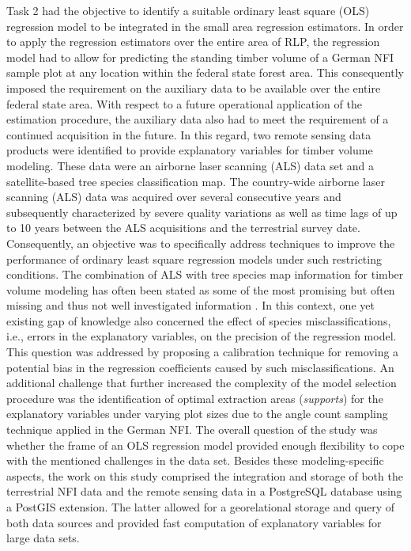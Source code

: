 Task 2 had the objective to identify a suitable ordinary least square (OLS) regression model to be integrated in the small area regression estimators. In order to apply the regression estimators over the entire area of RLP, the regression model had to allow for predicting the standing timber volume of a German NFI sample plot at any location within the federal state forest area. This consequently imposed the requirement on the auxiliary data to be available over the entire federal state area. With respect to a future operational application of the estimation procedure, the auxiliary data also had to meet the requirement of a continued acquisition in the future. In this regard, two remote sensing data products were identified to provide explanatory variables for timber volume modeling. These data were an airborne laser scanning (ALS) data set and a satellite-based tree species classification map. The country-wide airborne laser scanning (ALS) data was acquired over several consecutive years and subsequently characterized by severe quality variations as well as time lags of up to 10 years between the ALS acquisitions and the terrestrial survey date. Consequently, an objective was to specifically address techniques to improve the performance of ordinary least square regression models under such restricting conditions. The combination of ALS with tree species map information for timber volume modeling has often been stated as some of the most promising but often missing and thus not well investigated information \citep{koch2010, white2016}. In this context, one yet existing gap of knowledge also concerned the effect of species misclassifications, i.e., errors in the explanatory variables, on the precision of the regression model. This question was addressed by proposing a calibration technique for removing a potential bias in the regression coefficients caused by such misclassifications. An additional challenge that further increased the complexity of the model selection procedure was the identification of optimal extraction areas (\textit{supports}) for the explanatory variables under varying plot sizes due to the angle count sampling technique applied in the German NFI. The overall question of the study was whether the frame of an OLS regression model provided enough flexibility to cope with the mentioned challenges in the data set. Besides these modeling-specific aspects, the work on this study comprised the integration and storage of both the terrestrial NFI data and the remote sensing data in a PostgreSQL database using a PostGIS extension. The latter allowed for a georelational storage and query of both data sources and provided fast computation of explanatory variables for large data sets.

